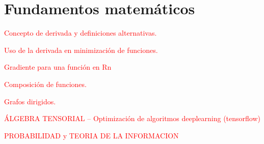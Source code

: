 \chapter{Fundamentos matemáticos}

\textcolor{red}{Concepto de derivada y definiciones alternativas.}

\textcolor{red}{Uso de la derivada en minimización de funciones.}

\textcolor{red}{Gradiente para una función en Rn}

\textcolor{red}{Composición de funciones.}

\textcolor{red}{Grafos dirigidos.}

\textcolor{red}{ÁLGEBRA TENSORIAL -- Optimización de algoritmos deeplearning (tensorflow)}

\textcolor{red}{PROBABILIDAD y TEORIA DE LA INFORMACION}